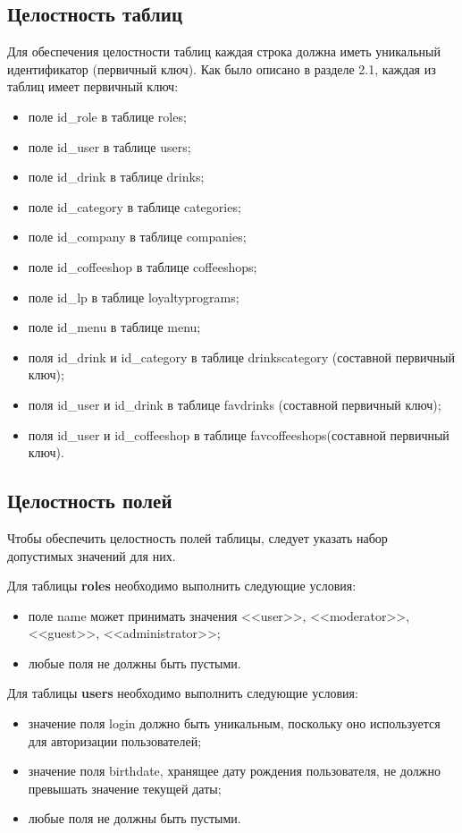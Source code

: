 \subsection{Целостность таблиц}
Для обеспечения целостности таблиц каждая строка должна иметь уникальный идентификатор (первичный ключ). Как было описано в разделе 2.1, каждая из таблиц имеет первичный ключ:
\begin{itemize}
	\item поле id\_role в таблице roles;
	\item поле id\_user в таблице users;
	\item поле id\_drink в таблице drinks;
	\item поле id\_category в таблице categories;
	\item поле id\_company в таблице companies;
	\item поле id\_coffeeshop в таблице coffeeshops;
	\item поле id\_lp в таблице loyaltyprograms;
	\item поле id\_menu в таблице menu;
	\item поля id\_drink и id\_category в таблице drinkscategory (составной первичный ключ);
	\item поля id\_user и id\_drink в таблице favdrinks (составной первичный ключ);
	\item поля id\_user и id\_coffeeshop в таблице favcoffeeshops(составной первичный ключ).
\end{itemize}

\subsection{Целостность полей}
Чтобы обеспечить целостность полей таблицы, следует указать набор допустимых значений для них.

Для таблицы \textbf{roles} необходимо выполнить следующие условия:
\begin{itemize}
 \item поле name может принимать значения <<user>>, <<moderator>>, <<guest>>, <<administrator>>; 
 \item любые поля не должны быть пустыми.%
 \end{itemize} 
 
 Для таблицы \textbf{users} необходимо выполнить следующие условия:
 \begin{itemize}
 	\item значение поля login должно быть уникальным, поскольку оно используется для авторизации пользователей;
 	\item значение поля birthdate, хранящее дату рождения пользователя, не должно превышать значение текущей даты;
 	\item любые поля не должны быть пустыми. %
 \end{itemize}
 
